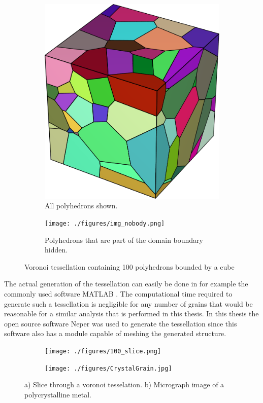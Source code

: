 \documentclass[micro_gen.tex]{subfiles}
\begin{document}
\begin{figure}
\centering
\begin{subfigure}[b]{.5\textwidth}
  \centering
  \includegraphics[width=.5\linewidth]{./figures/img_body.png}
  \caption{All polyhedrons shown.}
  \label{fig:pois_voronoi_a}
\end{subfigure}%
\begin{subfigure}[b]{.5\textwidth}
  \centering
  \texttt{[image: ./figures/img\_nobody.png]}
  \caption{Polyhedrons that are part of the domain boundary hidden.}
  \label{fig:pois_voronoi_b}
\end{subfigure}
\caption{Voronoi tessellation containing 100 polyhedrons bounded by a cube}
\label{fig:pois_voronoi}
\end{figure}


 The actual generation of the tessellation can easily be done in for example the commonly used software MATLAB \cite{matlab:voronoi}. The computational time required to generate such a tessellation is negligible for any number of grains that would be reasonable for a similar analysis that is performed in this thesis. In this thesis the open source software Neper \cite{Quey20111729} was used to generate the tessellation since this software also has a module capable of meshing the generated structure.

\begin{figure}
\centering
\begin{subfigure}[b]{.5\textwidth}
  \centering
  \texttt{[image: ./figures/100\_slice.png]}
  \caption{}
   \label{fig:slice_a}
\end{subfigure}%
\begin{subfigure}[b]{.5\textwidth}
  \centering
  \texttt{[image: ./figures/CrystalGrain.jpg]}
  \caption{}
  \label{fig:slice_b}
\end{subfigure}
\caption{a) Slice through a voronoi tesselation.  b) Micrograph image of a polycrystalline metal.\cite{wiki:grain}}
\label{fig:slice}
\end{figure}
\end{document}
